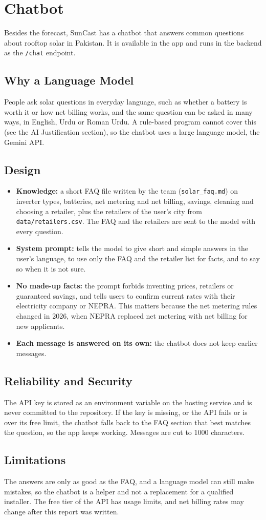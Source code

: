 \section{Chatbot}
Besides the forecast, SunCast has a chatbot that answers common questions
about rooftop solar in Pakistan. It is available in the app and runs in the
backend as the \texttt{/chat} endpoint.

\subsection{Why a Language Model}
People ask solar questions in everyday language, such as whether a battery is
worth it or how net billing works, and the same question can be asked in many
ways, in English, Urdu or Roman Urdu. A rule-based program cannot cover this
(see the AI Justification section), so the chatbot uses a large language
model, the Gemini API.

\subsection{Design}
\begin{itemize}
  \item \textbf{Knowledge:} a short FAQ file written by the team
        (\texttt{solar\_faq.md}) on inverter types, batteries, net metering
        and net billing, savings, cleaning and choosing a retailer, plus the
        retailers of the user's city from \texttt{data/retailers.csv}. The FAQ
        and the retailers are sent to the model with every question.
  \item \textbf{System prompt:} tells the model to give short and simple
        answers in the user's language, to use only the FAQ and the retailer
        list for facts, and to say so when it is not sure.
  \item \textbf{No made-up facts:} the prompt forbids inventing prices,
        retailers or guaranteed savings, and tells users to confirm current
        rates with their electricity company or NEPRA. This matters because
        the net metering rules changed in 2026, when NEPRA replaced net
        metering with net billing for new applicants.
  \item \textbf{Each message is answered on its own:} the chatbot does not
        keep earlier messages.
\end{itemize}

\subsection{Reliability and Security}
The API key is stored as an environment variable on the hosting service and
is never committed to the repository. If the key is missing, or the API fails
or is over its free limit, the chatbot falls back to the FAQ section that best
matches the question, so the app keeps working. Messages are cut to 1000
characters.

\subsection{Limitations}
The answers are only as good as the FAQ, and a language model can still make
mistakes, so the chatbot is a helper and not a replacement for a qualified
installer. The free tier of the API has usage limits, and net billing rates
may change after this report was written.